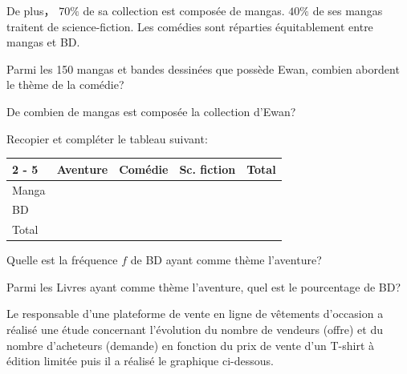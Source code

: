 \documentclass[11pt,a4paper]{article}  %
\begin{document}
De plus， $70 \%$ de sa collection est composée de mangas. $40 \%$ de ses mangas traitent de science-fiction. Les comédies sont réparties équitablement entre mangas et BD.

\begin{enumMet}
	\item Parmi les 150 mangas et bandes dessinées que possède Ewan, combien abordent le thème de la comédie?
	\item De combien de mangas est composée la collection d'Ewan?
	\item Recopier et compléter le tableau suivant:
	
	\begin{tabular}{|l|l|l|l|l|}
		\cline { 2 - 5 } \multicolumn{1}{c|}{} & Aventure & Comédie & Sc. fiction & Total \\
		\hline Manga & & & & \\
		\hline BD & & & & \\
		\hline Total & & & & \\
		\hline
	\end{tabular}
	\item Quelle est la fréquence $f$ de BD ayant comme thème l'aventure?
	\item Parmi les Livres ayant comme thème l'aventure, quel est le pourcentage de BD?\\
\end{enumMet}


\newpage
\exerciceDS{}

Le responsable d'une plateforme de vente en ligne de vêtements d'occasion a réalisé une étude concernant l'évolution du nombre de vendeurs (offre) et du nombre d'acheteurs (demande) en fonction du prix de vente d'un T-shirt à édition limitée puis il a réalisé le graphique ci-dessous.
\ \\

\begin{center}
\end{center} 
\end{document}
